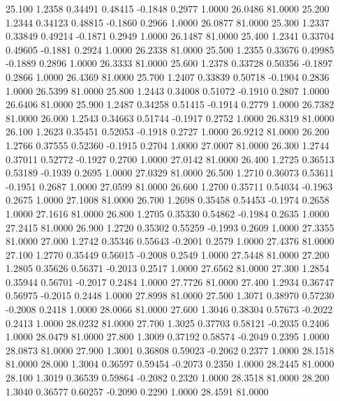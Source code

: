   25.100   1.2358   0.34491   0.48415  -0.1848   0.2977   1.0000  26.0486  81.0000
  25.200   1.2344   0.34123   0.48815  -0.1860   0.2966   1.0000  26.0877  81.0000
  25.300   1.2337   0.33849   0.49214  -0.1871   0.2949   1.0000  26.1487  81.0000
  25.400   1.2341   0.33704   0.49605  -0.1881   0.2924   1.0000  26.2338  81.0000
  25.500   1.2355   0.33676   0.49985  -0.1889   0.2896   1.0000  26.3333  81.0000
  25.600   1.2378   0.33728   0.50356  -0.1897   0.2866   1.0000  26.4369  81.0000
  25.700   1.2407   0.33839   0.50718  -0.1904   0.2836   1.0000  26.5399  81.0000
  25.800   1.2443   0.34008   0.51072  -0.1910   0.2807   1.0000  26.6406  81.0000
  25.900   1.2487   0.34258   0.51415  -0.1914   0.2779   1.0000  26.7382  81.0000
  26.000   1.2543   0.34663   0.51744  -0.1917   0.2752   1.0000  26.8319  81.0000
  26.100   1.2623   0.35451   0.52053  -0.1918   0.2727   1.0000  26.9212  81.0000
  26.200   1.2766   0.37555   0.52360  -0.1915   0.2704   1.0000  27.0007  81.0000
  26.300   1.2744   0.37011   0.52772  -0.1927   0.2700   1.0000  27.0142  81.0000
  26.400   1.2725   0.36513   0.53189  -0.1939   0.2695   1.0000  27.0329  81.0000
  26.500   1.2710   0.36073   0.53611  -0.1951   0.2687   1.0000  27.0599  81.0000
  26.600   1.2700   0.35711   0.54034  -0.1963   0.2675   1.0000  27.1008  81.0000
  26.700   1.2698   0.35458   0.54453  -0.1974   0.2658   1.0000  27.1616  81.0000
  26.800   1.2705   0.35330   0.54862  -0.1984   0.2635   1.0000  27.2415  81.0000
  26.900   1.2720   0.35302   0.55259  -0.1993   0.2609   1.0000  27.3355  81.0000
  27.000   1.2742   0.35346   0.55643  -0.2001   0.2579   1.0000  27.4376  81.0000
  27.100   1.2770   0.35449   0.56015  -0.2008   0.2549   1.0000  27.5448  81.0000
  27.200   1.2805   0.35626   0.56371  -0.2013   0.2517   1.0000  27.6562  81.0000
  27.300   1.2854   0.35944   0.56701  -0.2017   0.2484   1.0000  27.7726  81.0000
  27.400   1.2934   0.36747   0.56975  -0.2015   0.2448   1.0000  27.8998  81.0000
  27.500   1.3071   0.38970   0.57230  -0.2008   0.2418   1.0000  28.0066  81.0000
  27.600   1.3046   0.38304   0.57673  -0.2022   0.2413   1.0000  28.0232  81.0000
  27.700   1.3025   0.37703   0.58121  -0.2035   0.2406   1.0000  28.0479  81.0000
  27.800   1.3009   0.37192   0.58574  -0.2049   0.2395   1.0000  28.0873  81.0000
  27.900   1.3001   0.36808   0.59023  -0.2062   0.2377   1.0000  28.1518  81.0000
  28.000   1.3004   0.36597   0.59454  -0.2073   0.2350   1.0000  28.2445  81.0000
  28.100   1.3019   0.36539   0.59864  -0.2082   0.2320   1.0000  28.3518  81.0000
  28.200   1.3040   0.36577   0.60257  -0.2090   0.2290   1.0000  28.4591  81.0000
